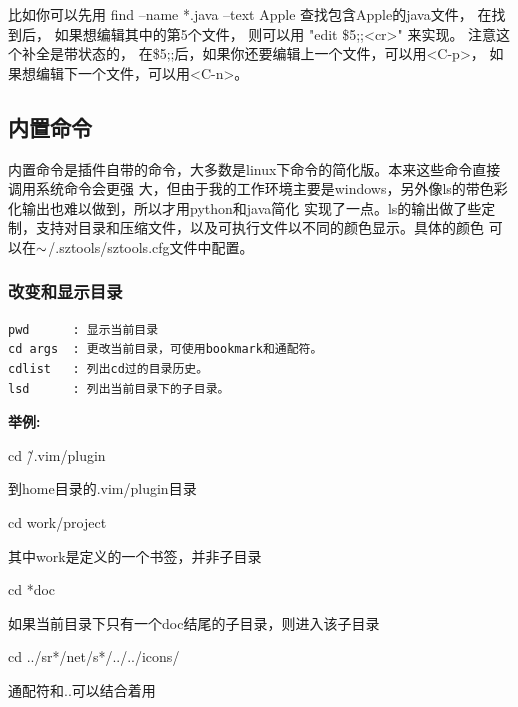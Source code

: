 \documentclass[oneside,openany]{book}
\begin{document}
  比如你可以先用 find --name *.java --text Apple 查找包含Apple的java文件， 在找到后，
如果想编辑其中的第5个文件， 则可以用 "edit \$5;;<cr>" 来实现。 注意这个补全是带状态的，
在\$5;;后，如果你还要编辑上一个文件，可以用<C-p>， 如果想编辑下一个文件，可以用<C-n>。


\subsection{内置命令}
     内置命令是插件自带的命令，大多数是linux下命令的简化版。本来这些命令直接调用系统命令会更强
大，但由于我的工作环境主要是windows，另外像ls的带色彩化输出也难以做到，所以才用python和java简化
实现了一点。ls的输出做了些定制，支持对目录和压缩文件，以及可执行文件以不同的颜色显示。具体的颜色
可以在$\tiny{\sim}$/.sztools/sztools.cfg文件中配置。

\subsubsection{改变和显示目录}

\begin{verbatim}
pwd      : 显示当前目录
cd args  : 更改当前目录，可使用bookmark和通配符。
cdlist   : 列出cd过的目录历史。
lsd      : 列出当前目录下的子目录。
\end{verbatim}

\begin{flushleft}\textbf{举例:}\end{flushleft}
\begin{mdframed}[style=SmallFrame] cd \~/.vim/plugin \end{mdframed}到home目录的.vim/plugin目录
\vspace{4mm}

\begin{mdframed}[style=SmallFrame] cd work/project \end{mdframed}其中work是定义的一个书签，并非子目录
\vspace{4mm}

\begin{mdframed}[style=SmallFrame] cd *doc \end{mdframed}如果当前目录下只有一个doc结尾的子目录，则进入该子目录
\vspace{4mm}

\begin{mdframed}[style=SmallFrame] cd ../sr*/net/s*/../../icons/ \end{mdframed}通配符和..可以结合着用
\vspace{4mm}
\end{document}
